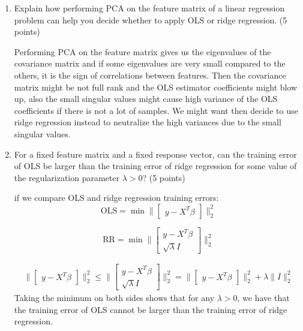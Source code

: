 \documentclass[11pt,twoside]{article}
\begin{document}
\begin{exam}
\begin{exercise}
\begin{problem}
\begin{enumerate}
\item Explain how performing PCA on the feature matrix of a linear regression problem can help you decide whether to apply OLS or ridge regression.  (5 points)

Performing PCA on the feature matrix gives us the eigenvalues of the covariance matrix and if some eigenvalues are very small compared to the others, it is the sign of correlations between features.
Then the covariance matrix might be not full rank and the OLS estimator coefficients might blow up, also the small singular values might cause high variance of the OLS coefficients if there is not a lot of samples.
We might want then decide to use ridge regression instead to neutralize the high variances due to the small singular values.

\item For a fixed feature matrix and a fixed response vector, can the training error of OLS be larger than the training error of ridge regression for some value of the regularization parameter $\lambda>0$?  (5 points)

if we compare OLS and ridge regression training errors:
$$\text{OLS} = \min \big\| \begin{bmatrix} y  - X^T \beta  \end{bmatrix}\big\|_2^2$$

$$\text{RR} = \min \big\| \begin{bmatrix} y  - X^T \beta  \\  \sqrt{\lambda} I \end{bmatrix}\big\|_2^2$$

\begin{align*}
	\big\| \begin{bmatrix} y  - X^T \beta  \end{bmatrix}\big\|_2^2 \le  \big\| \begin{bmatrix} y  - X^T \beta  \\  \sqrt{\lambda} I \end{bmatrix}\big\|_2^2 
	= \big\| \begin{bmatrix} y  - X^T \beta  \end{bmatrix}\big\|_2^2  +  \lambda \big\|  I \big\|_2^2 
\end{align*}
Taking the minimum on both sides shows that for any $\lambda > 0$, we have that the training error of OLS cannot be  larger than the training error of ridge regression.

\end{enumerate}

\end{problem}


\end{exercise}
\end{exam}
\end{document}
